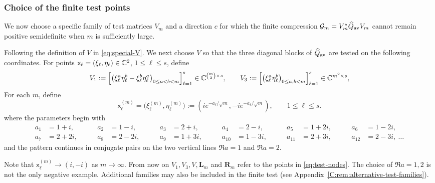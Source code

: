 \subsubsection{Choice of the finite test points}
\label{sec choose direction}

We now choose a specific family of test matrices $V_m$ and a direction
$c$ for which the finite compression
$
\mathcal G_m=V_m^*\widehat Q_{\rm av}V_m
$
cannot remain positive semidefinite when $m$ is sufficiently large.

Following the definition of $V$ in \eqref{eq:special-V}. We next choose $V$ so that the three diagonal blocks of
$\widehat Q_{\rm av}$ are tested on the following
coordinates.    For points
$\mathsf x_\ell=(\xi_\ell,\eta_\ell)\in\mathbb{C}^2$, $1\le\ell\le s$, define
\begin{equation}\label{eq:matched-features}
V_1:=
\left[
 \bigl(\xi_\ell^a\eta_\ell^b-\xi_\ell^b\eta_\ell^a\bigr)_{0\le a<b<m}
\right]_{\ell=1}^s
\in\mathbb{C}^{\binom m2 \times s},
\qquad
V_3:=
\left[
 \bigl(\xi_\ell^a\eta_\ell^b\bigr)_{0\le a,b<m}
\right]_{\ell=1}^s
\in\mathbb{C}^{m^2\times s},
\end{equation}
For each $m$, define
\begin{equation}\label{eq:test-nodes}
 \mathsf x_\ell^{(m)}
 =
 \bigl(\xi_\ell^{(m)},\eta_\ell^{(m)}\bigr)
 :=
 \left(
 ie^{-a_\ell/\sqrt m},
 -ie^{-\bar a_\ell/\sqrt m}
 \right),
 \qquad 1\le\ell\le s.
\end{equation}
where the parameters begin with
\[
\begin{alignedat}{6}
a_1&=1+i,      &\qquad a_2&=1-i,      &\qquad a_3&=2+i,      &\qquad a_4&=2-i,      &\qquad a_5&=1+2i,      &\qquad a_6&=1-2i,\\
a_7&=2+2i,     &\qquad a_8&=2-2i,     &\qquad a_9&=1+3i,     &\qquad a_{10}&=1-3i,  &\qquad a_{11}&=2+3i,  &\qquad a_{12}&=2-3i,\ \dotsc
\end{alignedat}
\]
and the pattern continues in conjugate pairs on the two vertical lines
$\Re a=1$ and $\Re a=2$. 

Note that $\mathsf x_\ell^{(m)}\to(i,-i)$ as $m\to\infty$.  From now on
$V_1,V_3,V,\mathbf L_m$ and $\mathbf R_m$ refer to the points
in \eqref{eq:test-nodes}.
The choice of $\Re a=1,2$ is not the only negative example.  Additional
families may also be included in the finite test (see
Appendix~\ref{C:rem:alternative-test-families}).

